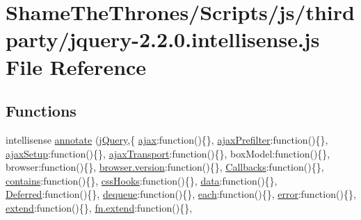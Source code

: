 \hypertarget{jquery-2_82_80_8intellisense_8js}{}\section{Shame\+The\+Thrones/\+Scripts/js/thirdparty/jquery-\/2.2.0.intellisense.\+js File Reference}
\label{jquery-2_82_80_8intellisense_8js}
\subsection*{Functions}
\begin{DoxyCompactItemize}
\item 
intellisense \hyperlink{jquery-2_82_80_8intellisense_8js_a8bc0beea95a85011d311dd0454f8b3d0}{annotate} (\hyperlink{jquery_8rateyo_8min_8js_a2b1d6f9c448e3ce72f4e1865d6e38d2c}{j\+Query},\{ \textquotesingle{}\hyperlink{jquery-2_82_81-vsdoc_8js_a3c9e2ac71a76356869090140308936dc}{ajax}\textquotesingle{}\+:function()\{\}, \textquotesingle{}\hyperlink{jquery-2_82_81-vsdoc_8js_a414ccda111294ca405827d1f416a7512}{ajax\+Prefilter}\textquotesingle{}\+:function()\{\}, \textquotesingle{}\hyperlink{jquery-2_82_81-vsdoc_8js_a3b12f4f2a83dfdae4e81bcaeaf2a2f42}{ajax\+Setup}\textquotesingle{}\+:function()\{\}, \textquotesingle{}\hyperlink{jquery-2_82_81-vsdoc_8js_afe3900e3907689b52735b9c2bf0b8ff6}{ajax\+Transport}\textquotesingle{}\+:function()\{\}, \textquotesingle{}box\+Model\textquotesingle{}\+:function()\{\}, \textquotesingle{}browser\textquotesingle{}\+:function()\{\}, \textquotesingle{}\hyperlink{_shame_the_thrones_2_scripts_2js_2thirdparty_2bootstrap_8min_8js_af15ce22371f8af3b38c7d40a4987b366}{browser.\+version}\textquotesingle{}\+:function()\{\}, \textquotesingle{}\hyperlink{jquery-2_82_80_8intellisense_8js_add8d59d25831bb9b171fdbee8a18795b}{Callbacks}\textquotesingle{}\+:function()\{\}, \textquotesingle{}\hyperlink{tsc_8js_a7665f31886bcd4ed39aa87c79ed64340}{contains}\textquotesingle{}\+:function()\{\}, \textquotesingle{}\hyperlink{jquery-2_82_81-vsdoc_8js_a9966a63bdc4e33753dbe36a83e7f96bf}{css\+Hooks}\textquotesingle{}\+:function()\{\}, \textquotesingle{}\hyperlink{jquery-2_82_81-vsdoc_8js_a609407b3456fdc3c5671a9fc4a226ff7}{data}\textquotesingle{}\+:function()\{\}, \textquotesingle{}\hyperlink{jquery-2_82_80_8intellisense_8js_ab355ffd82371d88c17da7c1dae9e8829}{Deferred}\textquotesingle{}\+:function()\{\}, \textquotesingle{}\hyperlink{jquery-2_82_81-vsdoc_8js_a721f718178dce35dc9a4bf9fe8b6de23}{dequeue}\textquotesingle{}\+:function()\{\}, \textquotesingle{}\hyperlink{jquery-2_82_80_8min_8js_a53c7b9ea828db458b7ad4c5bd7d20b58}{each}\textquotesingle{}\+:function()\{\}, \textquotesingle{}\hyperlink{jquery-2_82_81-vsdoc_8js_acd25716dc66c2c57df2fc97807ffbddf}{error}\textquotesingle{}\+:function()\{\}, \textquotesingle{}\hyperlink{jquery-2_82_80_8min_8js_a798d2452a6cada224fa212d35d4e0325}{extend}\textquotesingle{}\+:function()\{\}, \textquotesingle{}\hyperlink{jquery-2_82_80_8min_8js_a798d2452a6cada224fa212d35d4e0325}{fn.\+extend}\textquotesingle{}\+:function()\{\}, 
\end{DoxyCompactItemize}
